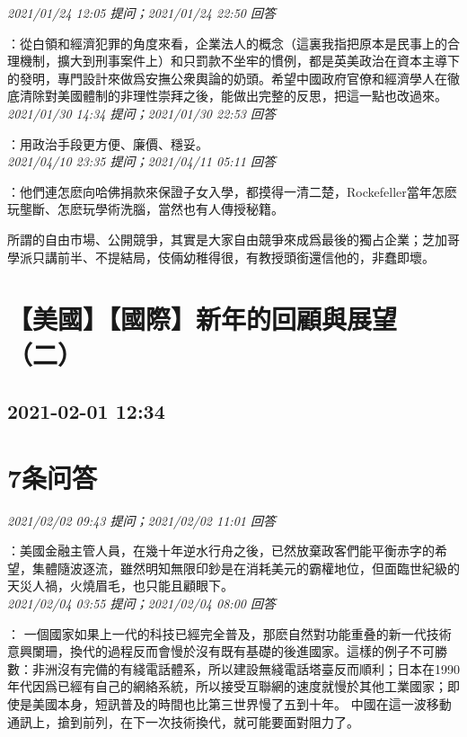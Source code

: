 \documentclass[twocolumn]{ctexart}
\begin{document}
\textit{\hfill\noindent\small 2021/01/24 12:05 提问；2021/01/24 22:50 回答}

：從白領和經濟犯罪的角度來看，企業法人的概念（這裏我指把原本是民事上的合理機制，擴大到刑事案件上）和只罰款不坐牢的慣例，都是英美政治在資本主導下的發明，專門設計來做爲安撫公衆輿論的奶頭。希望中國政府官僚和經濟學人在徹底清除對美國體制的非理性崇拜之後，能做出完整的反思，把這一點也改過來。
\\

\textit{\hfill\noindent\small 2021/01/30 14:34 提问；2021/01/30 22:53 回答}

：用政治手段更方便、廉價、穩妥。
\\

\textit{\hfill\noindent\small 2021/04/10 23:35 提问；2021/04/11 05:11 回答}

：他們連怎麽向哈佛捐款來保證子女入學，都摸得一清二楚，Rockefeller當年怎麽玩壟斷、怎麽玩學術洗腦，當然也有人傳授秘籍。

所謂的自由市場、公開競爭，其實是大家自由競爭來成爲最後的獨占企業；芝加哥學派只講前半、不提結局，伎倆幼稚得很，有教授頭銜還信他的，非蠢即壞。
\\


\section{【美國】【國際】新年的回顧與展望（二）}
\subsection{2021-02-01 12:34}


\section{7条问答}

\textit{\hfill\noindent\small 2021/02/02 09:43 提问；2021/02/02 11:01 回答}

：美國金融主管人員，在幾十年逆水行舟之後，已然放棄政客們能平衡赤字的希望，集體隨波逐流，雖然明知無限印鈔是在消耗美元的霸權地位，但面臨世紀級的天災人禍，火燒眉毛，也只能且顧眼下。
\\

\textit{\hfill\noindent\small 2021/02/04 03:55 提问；2021/02/04 08:00 回答}

：
一個國家如果上一代的科技已經完全普及，那麽自然對功能重叠的新一代技術意興闌珊，換代的過程反而會慢於沒有既有基礎的後進國家。這樣的例子不可勝數：非洲沒有完備的有綫電話體系，所以建設無綫電話塔臺反而順利；日本在1990年代因爲已經有自己的網絡系統，所以接受互聯網的速度就慢於其他工業國家；即使是美國本身，短訊普及的時間也比第三世界慢了五到十年。
中國在這一波移動通訊上，搶到前列，在下一次技術換代，就可能要面對阻力了。
\\
\end{document}
